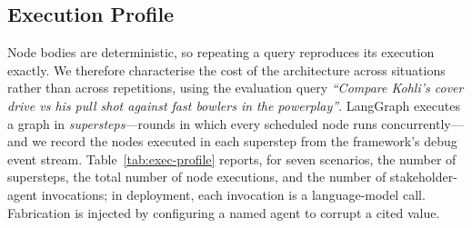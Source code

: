 %
%
%
%

\subsection{Execution Profile}
\label{sec:exec-profile}

Node bodies are deterministic, so repeating a query reproduces its execution
exactly. We therefore characterise the cost of the architecture across
situations rather than across repetitions, using the evaluation query
\emph{``Compare Kohli's cover drive vs his pull shot against fast bowlers in
the powerplay''}. LangGraph executes a graph in \emph{supersteps}---rounds in
which every scheduled node runs concurrently---and we record the nodes executed
in each superstep from the framework's debug event stream.
Table~\ref{tab:exec-profile} reports, for seven scenarios, the number of
supersteps, the total number of node executions, and the number of
stakeholder-agent invocations; in deployment, each invocation is a
language-model call. Fabrication is injected by configuring a named agent to
corrupt a cited value.

\begin{table}[t]
  \centering
  \footnotesize
  \setlength{\tabcolsep}{4pt}
  \caption{Execution profile of the evaluation query. $r$: vision retries;
    $g$: regenerations. In the worst case the clip is rejected twice and every
    activated agent fabricates on every attempt, so its findings are withheld.
    Each scenario was run once: node bodies are deterministic, so repeated runs
    are identical.}
  \label{tab:exec-profile}
  
\end{table}

